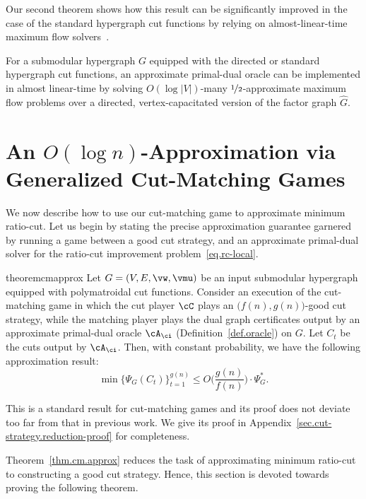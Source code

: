 \documentclass[letterpaper]{article}
\begin{document}
Our second theorem shows how this result can be significantly improved in the case of the standard hypergraph cut functions by relying on almost-linear-time maximum flow solvers~\cite{bernstein2022deterministic,chenMaximumFlowMinimumCost2022}.

\begin{theorem}
\label{thm.maxflow-solver}
For a submodular hypergraph $G$ equipped with the directed or standard hypergraph cut functions,
an approximate primal-dual oracle can be implemented in almost linear-time by solving $O(\log |V|)$-many $\nicefrac{1}{2}$-approximate maximum flow problems over a directed, vertex-capacitated version of the factor graph $\hat{G}.$
\end{theorem}
 

\section{An \texorpdfstring{$O(\log n)$}{O(log n)}-Approximation via Generalized Cut-Matching Games}
\label{sec.alg-cm}

We now describe how to use our cut-matching game to approximate minimum ratio-cut.
Let us begin by stating the precise approximation guarantee garnered by running a game between a good cut strategy, and an approximate primal-dual solver for the ratio-cut improvement problem~\eqref{eq.rc-local}.

\begin{restatable}{theorem}{cmapprox}
\label{thm.cm.approx}
Let $G=(V, E, \vw, \vmu)$ be an input submodular hypergraph equipped with polymatroidal cut functions. Consider an execution of the cut-matching game in which the cut player $\cC$ plays an $\big( f(n), g(n) \big)$-good cut strategy, while the matching player plays the dual graph certificates output by an approximate primal-dual oracle $\cA_{\ci}$ (Definition~\ref{def.oracle}) on $G$.
Let $C_t$ be the cuts output by $\cA_{\ci}$.
Then, with constant probability, we have the following approximation result:
$$
\min \bigg\{\Psi_G(C_t)\bigg\}_{t=1}^{g(n)} \leq O\bigg(\frac{g(n)}{f(n)}\bigg) \cdot \Psi^*_G.
$$
\end{restatable}

\noindent
This is a standard result for cut-matching games and its proof does not deviate too far from that in previous work. We give its proof in Appendix~\ref{sec.cut-strategy.reduction-proof} for completeness.

Theorem~\ref{thm.cm.approx} reduces the task of approximating minimum ratio-cut to constructing a good cut strategy. Hence, this section is devoted towards proving the following theorem.
\end{document}

